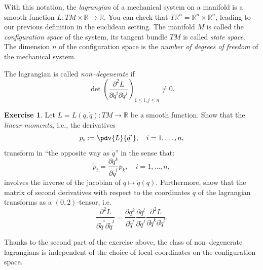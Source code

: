 \documentclass[english,fontsize=11pt,paper=b5]{scrbook}
\numberwithin{equation}{chapter}
\theoremstyle{definition}
\newtheorem{exercise}{Exercise}[chapter]
\begin{document}
    With this notation, the \emph{lagrangian} of a mechanical system on a manifold is a smooth function $L : TM\times\mathbb{R} \to \mathbb{R}$.
    You can check that $T\mathbb{R}^n = \mathbb{R}^n \times \mathbb{R}^n$, leading to our previous definition in the euclidean setting.
    The manifold $M$ is called the \emph{configuration space} of the system, its tangent bundle $TM$ is called \emph{state space}. The dimension $n$ of the configuration space is the \emph{number of degrees of freedom} of the mechanical system.

    The lagrangian is called \emph{non--degenerate} if
    \begin{equation}
      \det %
      \left(\frac{\partial^2 L}{\partial \dot{q}^i \partial \dot{q}^j}\right)_{1\leq i,j\leq n}
      \neq 0.
    \end{equation}

    \begin{exercise}\label{exe:coordinatesInd}
      Let $L=L(q,\dot q):TM \to \mathbb{R}$ be a smooth function. Show that the \emph{linear momenta}, i.e., the derivatives
      \begin{equation}
        p_i := \pdv{L}{\dot q^i}, \quad i=1,\ldots,n,
      \end{equation}
      transform in ``the opposite way as $\dot q$'' in the sense that:
      \begin{equation}
        \widetilde p_i = \frac{\partial q^k}{\partial {\widetilde q}^i} p_k, \quad i=1,\ldots,n,
      \end{equation}
      involves the inverse of the jacobian of $q\mapsto \widetilde q(q)$.
      Furthermore, show that the matrix of second derivatives with respect to the coordinates $\dot q$ of the lagrangian transforms as a $(0,2)$-tensor, i.e.
      \begin{equation}
        \frac{\partial^2 L}{\partial \dot{\widetilde q}^i \partial \dot{\widetilde q}^j} =
        \frac{\partial q^k}{\partial {\widetilde q}^i}\frac{\partial q^l}{\partial {\widetilde q}^j}
        \frac{\partial^2 L}{\partial \dot{q}^k \partial \dot{q}^l}.
      \end{equation}
    \end{exercise}
    Thanks to the second part of the exercise above, the class of non--degenerate lagrangians is independent of the choice of local coordinates on the configuration space.
\end{document}
